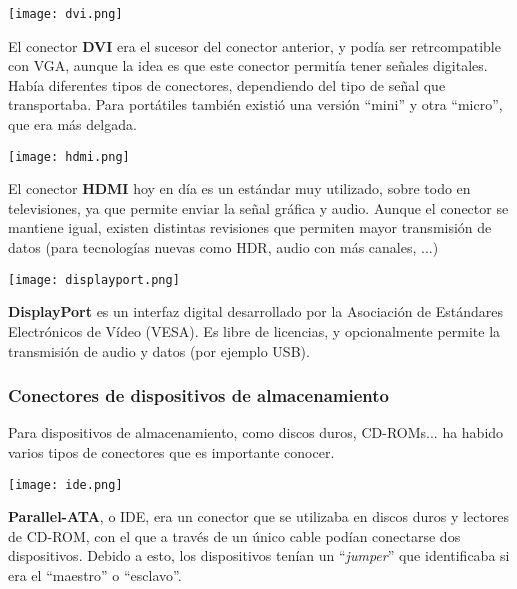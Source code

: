 \vspace{12pt}
\begin{minipage}{0.15\linewidth}
   \texttt{[image: dvi.png]}
\end{minipage}
\hfill
\begin{minipage}{0.8\linewidth}
   El conector \textbf{DVI} era el sucesor del conector anterior, y podía ser retrcompatible con VGA, aunque la idea es que este conector permitía tener señales digitales. Había diferentes tipos de conectores, dependiendo del tipo de señal que transportaba. Para portátiles también existió una versión “mini” y otra “micro”, que era más delgada.
\end{minipage}


\vspace{12pt}
\begin{minipage}{0.15\linewidth}
    \texttt{[image: hdmi.png]}
\end{minipage}
\hfill
\begin{minipage}{0.8\linewidth}
    El conector \textbf{HDMI} hoy en día es un estándar muy utilizado, sobre todo en televisiones, ya que permite enviar la señal gráfica y audio. Aunque el conector se mantiene igual, existen distintas revisiones que permiten mayor transmisión de datos (para tecnologías nuevas como HDR, audio con más canales, ...)
\end{minipage}

\vspace{12pt}
\begin{minipage}{0.15\linewidth}
    \texttt{[image: displayport.png]}
\end{minipage}
\hfill
\begin{minipage}{0.8\linewidth}
    \textbf{DisplayPort} es un interfaz digital desarrollado por la Asociación de Estándares Electrónicos de Vídeo (VESA). Es libre de licencias, y opcionalmente permite la transmisión de audio y datos (por ejemplo USB).
\end{minipage}


\subsubsection{Conectores de dispositivos de almacenamiento}

Para dispositivos de almacenamiento, como discos duros, CD-ROMs... ha habido varios tipos de conectores que es importante conocer.

\begin{minipage}{0.15\linewidth}
    \texttt{[image: ide.png]}
\end{minipage}
\hfill
\begin{minipage}{0.8\linewidth}
    \textbf{Parallel-ATA}, o IDE, era un conector que se utilizaba en discos duros y lectores de CD-ROM, con el que a través de un único cable podían conectarse dos dispositivos. Debido a esto, los dispositivos tenían un “\textit{jumper}” que identificaba si era el “maestro” o “esclavo”.
\end{minipage}

